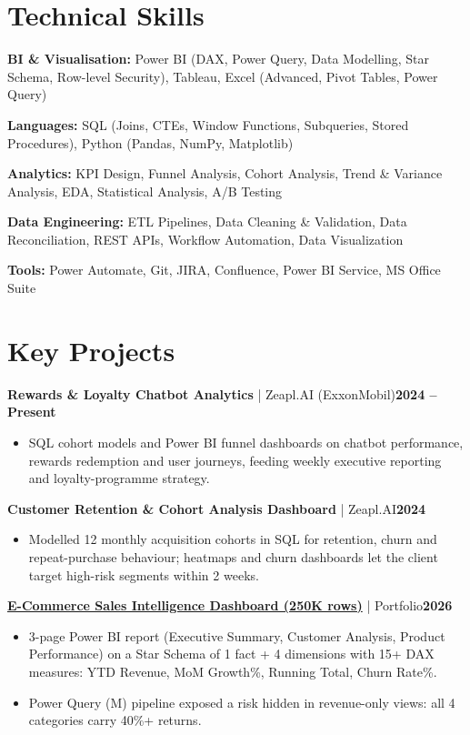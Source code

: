 \documentclass[a4paper,10pt]{article}
\newcommand{\headrow}[2]{%
  {\parfillskip=0pt\relax\rightskip=0pt\relax #1\hfill #2\par}%
}
\newcommand{\project}[3]{%
  \vspace{3pt}%
  \headrow{\textbf{#1} \textcolor{black!60}{| #2}}{\textbf{#3}}%
}
\newcommand{\skillline}[2]{\textbf{#1:} #2\par\vspace{1.5pt}}
\begin{document}
\section{Technical Skills}
{\small
\skillline{BI \& Visualisation}{Power BI (DAX, Power Query, Data Modelling, Star Schema, Row-level Security), Tableau, Excel (Advanced, Pivot Tables, Power Query)}
\skillline{Languages}{SQL (Joins, CTEs, Window Functions, Subqueries, Stored Procedures), Python (Pandas, NumPy, Matplotlib)}
\skillline{Analytics}{KPI Design, Funnel Analysis, Cohort Analysis, Trend \& Variance Analysis, EDA, Statistical Analysis, A/B Testing}
\skillline{Data Engineering}{ETL Pipelines, Data Cleaning \& Validation, Data Reconciliation, REST APIs, Workflow Automation, Data Visualization}
\skillline{Tools}{Power Automate, Git, JIRA, Confluence, Power BI Service, MS Office Suite}
}

\section{Key Projects}

\project{Rewards \& Loyalty Chatbot Analytics}{Zeapl.AI (ExxonMobil)}{2024 -- Present}
\begin{itemize}
  \item SQL cohort models and Power BI funnel dashboards on chatbot performance, rewards redemption and user journeys, feeding weekly executive reporting and loyalty-programme strategy.
\end{itemize}

\project{Customer Retention \& Cohort Analysis Dashboard}{Zeapl.AI}{2024}
\begin{itemize}
  \item Modelled 12 monthly acquisition cohorts in SQL for retention, churn and repeat-purchase behaviour; heatmaps and churn dashboards let the client target high-risk segments within 2 weeks.
\end{itemize}

\project{\href{https://github.com/Mittal-99/ecommerce-powerbi-dashboard}{E-Commerce Sales Intelligence Dashboard (250K rows)}}{Portfolio}{2026}
\begin{itemize}
  \item 3-page Power BI report (Executive Summary, Customer Analysis, Product Performance) on a Star Schema of 1 fact + 4 dimensions with 15+ DAX measures: YTD Revenue, MoM Growth\%, Running Total, Churn Rate\%.
  \item Power Query (M) pipeline exposed a risk hidden in revenue-only views: all 4 categories carry 40\%+ returns.
\end{itemize}
\end{document}
